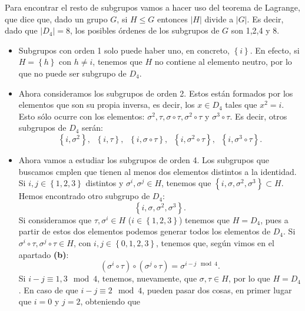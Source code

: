 \documentclass{article}
\begin{document}
\begin{sol}
\begin{description}
	Para encontrar el resto de subgrupos vamos a hacer uso del teorema de Lagrange, que dice que, dado un grupo $\displaystyle G $, si $\displaystyle H \leq G $ entonces $\displaystyle \left|H\right|  $ divide a $\displaystyle \left|G\right| $. Es decir, dado que $\displaystyle \left|D_{4}\right| = 8 $, los posibles órdenes de los subgrupos de $\displaystyle G $ son 1,2,4 y 8. 
	\begin{itemize}
		\item Subgrupos con orden 1 solo puede haber uno, en concreto, $\displaystyle \left\{ i\right\}  $. En efecto, si $\displaystyle H = \left\{ h\right\}$ con $\displaystyle h \neq i $, tenemos que $\displaystyle H $ no contiene al elemento neutro, por lo que no puede ser subgrupo de $\displaystyle D_{4} $.
		\item Ahora consideramos los subgrupos de orden 2. Estos están formados por los elementos que son su propia inversa, es decir, los $\displaystyle x \in D_{4} $ tales que $\displaystyle x^{2} = i $. Esto sólo ocurre con los elementos: $\displaystyle \sigma^{2}, \tau, \sigma\circ\tau, \sigma^{2}\circ\tau  $ y $\displaystyle \sigma^{3}\circ\tau $. Es decir, otros subgrupos de $\displaystyle D_{4} $ serán:
		\[ \left\{ i,\sigma^{2}\right\} , \; \; \left\{ i, \tau\right\}, \; \; \left\{ i, \sigma\circ\tau\right\} , \; \; \left\{i, \sigma^{2}\circ\tau\right\}, \; \; \left\{ i, \sigma^{3}\circ\tau\right\}   .\]
		\item Ahora vamos a estudiar los subgrupos de orden 4. Los subgrupos que buscamos cmplen que tienen al menos dos elementos distintos a la identidad. Si $\displaystyle i,j \in \left\{ 1,2,3\right\}  $ distintos y $\displaystyle \sigma^{i} , \sigma^{j}\in H $, tenemos que $\displaystyle \left\{ i, \sigma, \sigma^{2}, \sigma^{3}\right\} \subset H $. Hemos encontrado otro subgrupo de $\displaystyle D_{4} $:
		\[ \left\{ i, \sigma, \sigma^{2}, \sigma^{3}\right\}  .\]
		Si consideramos que $\displaystyle \tau, \sigma^{i} \in H $ ($\displaystyle i \in \left\{ 1,2,3\right\}  $) tenemos que $ H = D_{4}$, pues a partir de estos dos elementos podemos generar todos los elementos de $\displaystyle D_{4} $. 
		Si $\displaystyle \sigma^{i} \circ \tau, \sigma^{j}\circ\tau \in H $, con $\displaystyle i,j \in \left\{0, 1,2,3\right\}  $, tenemos que, según vimos en el apartado \textbf{(b)}:
\[ \left(\sigma^{i}\circ\tau\right)\circ\left(\sigma^{j}\circ\tau\right) = \sigma^{i-j \mod 4} .\]
Si $\displaystyle i - j \equiv 1,3 \mod 4 $, tenemos, nuevamente, que $\displaystyle \sigma, \tau \in H $, por lo que $\displaystyle H = D_{4} $. En caso de que $\displaystyle i - j \equiv 2 \mod 4 $, pueden pasar dos cosas, en primer lugar que $\displaystyle i = 0 $ y $\displaystyle j = 2 $, obteniendo que

\end{itemize}
\end{description}
\end{sol}
\end{document}
